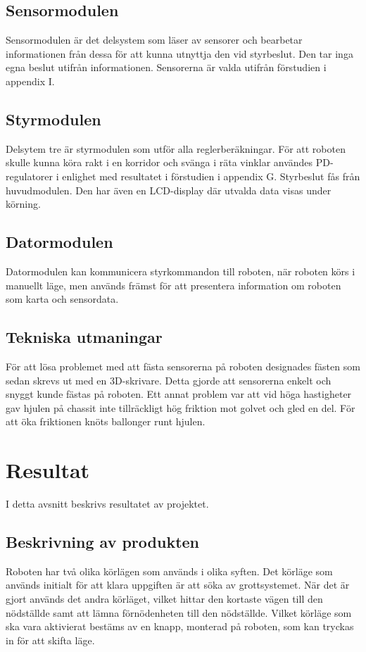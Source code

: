 \documentclass[11pt]{article}
\begin{document}
\begin{flushleft}
\subsection{Sensormodulen}
Sensormodulen är det delsystem som läser av sensorer och bearbetar informationen från dessa för att kunna utnyttja den vid styrbeslut. Den tar inga egna beslut utifrån informationen. Sensorerna är valda utifrån förstudien i appendix I. 

\subsection{Styrmodulen}
Delsytem tre är styrmodulen som utför alla reglerberäkningar. För att roboten skulle kunna köra rakt i en korridor och svänga i räta vinklar användes PD-regulatorer i enlighet med resultatet i förstudien i appendix G. Styrbeslut fås från huvudmodulen. Den har även en LCD-display där utvalda data visas under körning. 

\subsection{Datormodulen}
Datormodulen kan kommunicera styrkommandon till roboten, när roboten körs i manuellt läge, men används främst för att presentera information om roboten som karta och sensordata. 

\subsection{Tekniska utmaningar}
För att lösa problemet med att fästa sensorerna på roboten designades fästen som sedan skrevs ut med en 3D-skrivare. Detta gjorde att sensorerna enkelt och snyggt kunde fästas på roboten. Ett annat problem var att vid höga hastigheter gav hjulen på chassit inte tillräckligt hög friktion mot golvet och gled en del. För att öka friktionen knöts ballonger runt hjulen.

\pagebreak

\section{Resultat}
I detta avsnitt beskrivs resultatet av projektet.

\subsection{Beskrivning av produkten}
Roboten har två olika körlägen som används i olika syften. Det körläge som används initialt för att klara uppgiften är att söka av grottsystemet. När det är gjort används det andra körläget, vilket hittar den kortaste vägen till den nödställde samt att lämna förnödenheten till den nödställde. Vilket körläge som ska vara aktivierat bestäms av en knapp, monterad på roboten, som kan tryckas in för att skifta läge. 


\end{flushleft}
\end{document}
